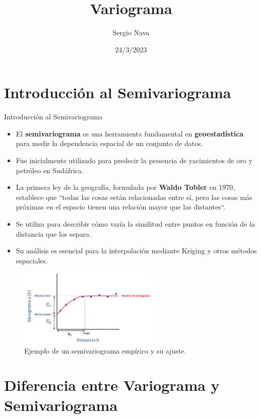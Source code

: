 \documentclass[
  10pt,
  ignorenonframetext,
]{beamer}
\title{Variograma}
\author{Sergio Nava}
\date{24/3/2023}
\providecommand{\tightlist}{%
  \setlength{\itemsep}{0pt}\setlength{\parskip}{0pt}}
\begin{document}
\frame{\titlepage}

\section{Introducción al
Semivariograma}\label{introducciuxf3n-al-semivariograma}

\begin{frame}{Introducción al Semivariograma}
\begin{itemize}
\tightlist
\item
  El \textbf{semivariograma} es una herramienta fundamental en
  \textbf{geoestadística} para medir la dependencia espacial de un
  conjunto de datos.
\item
  Fue inicialmente utilizado para predecir la presencia de yacimientos
  de oro y petróleo en Sudáfrica.
\item
  La primera ley de la geografía, formulada por \textbf{Waldo Tobler} en
  1970, establece que ``todas las cosas están relacionadas entre sí,
  pero las cosas más próximas en el espacio tienen una relación mayor
  que las distantes``.
\item
  Se utiliza para describir cómo varía la similitud entre puntos en
  función de la distancia que los separa.
\item
  Su análisis es esencial para la interpolación mediante Kriging y otros
  métodos espaciales.
\end{itemize}
\end{frame}

\begin{frame}
\begin{figure}
    \centering
    \includegraphics[width=0.6\textwidth]{./imagenes/figura1.png}
    \caption{Ejemplo de un semivariograma empírico y su ajuste.}
\end{figure}
\end{frame}

\section{Diferencia entre Variograma y
Semivariograma}\label{diferencia-entre-variograma-y-semivariograma}
\end{document}
